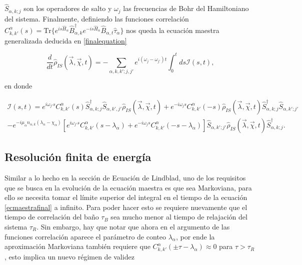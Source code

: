 $\hat{S}_{\alpha,k;j}$ son los operadores de salto y $\omega_{j}$ las frecuencias de Bohr del Hamiltoniano del sistema. Finalmente, definiendo las funciones correlación $C^{\alpha}_{k,k'}(s) = \text{Tr}\{e^{is\hat{H}_{\alpha} }\hat{B}^{\dagger}_{\alpha,k}e^{-is\hat{H}_{\alpha} }\hat{B}_{\alpha,t}\hat{\tau}_{\alpha}\}$ nos queda la ecuación maestra generalizada deducida en \ref{finalequation}

\begin{equation}
    \frac{d}{dt}\hat{\rho}_{IS}(\vec{\lambda},\vec{\chi},t) = - \sum_{\alpha,k,k';j,j'}e^{i(\omega_{j}-\omega_{j'})t}\int_{0}^{t}ds \mathcal{I}(s,t) ,
\label{ecmaestrafinal}
\end{equation}

en donde

\begin{multline*}
    \mathcal{I}(s,t) = e^{i\omega_{j'}s} C^{\alpha}_{k,k'}(s)\hat{S}^{\dagger}_{\alpha,k;j}\hat{S}_{\alpha,k',j'}\hat{\rho}_{IS}(\vec{\lambda},\vec{\chi},t) + e^{-i\omega_{j}s}C^{\alpha}_{k,k'}(-s)\hat{\rho}_{IS}(\vec{\lambda},\vec{\chi},t)\hat{S}^{\dagger}_{\alpha,k;j}\hat{S}_{\alpha,k';j'} \\
    - e^{-i\mu_{\alpha}n_{\alpha,k}(\lambda_{\alpha} - \chi_{\alpha})}\left[e^{i\omega_{j'}s}C^{\alpha}_{k,k'}(s-\lambda_{\alpha}) + e^{-i\omega_{j}s}C^{\alpha}_{k,k'}(-s-\lambda_{\alpha})  \right]  \hat{S}_{\alpha,k';j'}\hat{\rho}_{IS}(\vec{\lambda},\vec{\chi},t)\hat{S}^{\dagger}_{\alpha,k;j}.
\end{multline*}

\label{sec2:master}

\subsection{Resolución finita de energía}
Similar a lo hecho en la sección de Ecuación de Lindblad, uno de los requisitos que se busca en la evolución de la ecuación maestra es que sea Markoviana, para ello se necesita tomar el límite superior del integral en el tiempo de la ecuación \ref{ecmaestrafinal} a infinito. Para poder hacer esto se requiere nuevamente que el tiempo de correlación del baño $\tau_{B}$ sea mucho menor al tiempo de relajación del sistema $\tau_{R}$. Sin embargo, hay que notar que ahora en el argumento de las funciones correlación aparece el parámetro de conteo $\lambda_{\alpha}$, por ende la aproximación Markoviana también requiere que $C^{\alpha}_{k,k'}(\pm \tau - \lambda_\alpha) \approx 0$ para $\tau > \tau_{R}$, esto implica un nuevo régimen de validez

